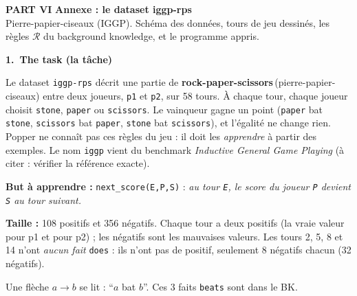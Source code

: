 \documentclass[10pt]{article}
\newcommand{\EN}[2]{\textbf{#1}\,{\scriptsize\textcolor{marine}{(#2)}}}
\newcommand{\titrebox}[2]{\needspace{10\baselineskip}\vspace{8pt}
  \begin{tcolorbox}[colback=marine, colframe=marine, arc=0pt, boxrule=0pt,
    top=4pt, bottom=4pt, left=8pt]
  \color{white}\Large\bfseries #1.~#2
  \end{tcolorbox}\vspace{2pt}}
\newcommand{\partie}[3]{\newpage
  \begin{tcolorbox}[colback=pastel, colframe=pastel, arc=0pt, boxrule=0pt,
    top=8pt, bottom=8pt, left=10pt]
  {\fontsize{26}{28}\selectfont\bfseries\textcolor{marine}{PART #1}}\quad
  {\Large\bfseries\textcolor{encre}{#2}}\\[2pt]{\small #3}
  \end{tcolorbox}\vspace{4pt}}
\begin{document}
\partie{VI}{Annexe : le dataset iggp-rps}{Pierre-papier-ciseaux (IGGP). Schéma des données, tours de jeu dessinés, les règles $\mathcal{R}$ du background knowledge, et le programme appris.}

\titrebox{1}{The task (la tâche)}
Le dataset \texttt{iggp-rps} décrit une partie de \EN{rock-paper-scissors}{pierre-papier-ciseaux} entre deux joueurs, \texttt{p1} et \texttt{p2}, sur 58 tours. À chaque tour, chaque joueur choisit
\texttt{stone}, \texttt{paper} ou \texttt{scissors}. Le vainqueur gagne un point (\texttt{paper} bat \texttt{stone}, \texttt{scissors} bat \texttt{paper}, \texttt{stone} bat \texttt{scissors}), et l'égalité ne change rien.
Popper ne connaît pas ces règles du jeu : il doit les \emph{apprendre} à partir des exemples. Le nom \texttt{iggp} vient du benchmark \emph{Inductive General Game Playing} (à citer : vérifier la référence exacte).
\begin{moi}
\textbf{But à apprendre :} \texttt{next\_score(E,P,S)} : \emph{au tour \texttt{E}, le score du joueur \texttt{P} devient \texttt{S} au tour suivant.}
\end{moi}
\textbf{Taille :} 108 positifs et 356 négatifs. Chaque tour a deux positifs (la vraie valeur pour p1 et pour p2) ; les négatifs sont les mauvaises valeurs.
Les tours 2, 5, 8 et 14 n'ont \emph{aucun fait} \texttt{does} : ils n'ont pas de positif, seulement 8 négatifs chacun (32 négatifs).
\begin{center}
\end{center}
Une flèche $a\to b$ se lit : ``$a$ bat $b$''. Ces 3 faits \texttt{beats} sont dans le BK.
\end{document}
